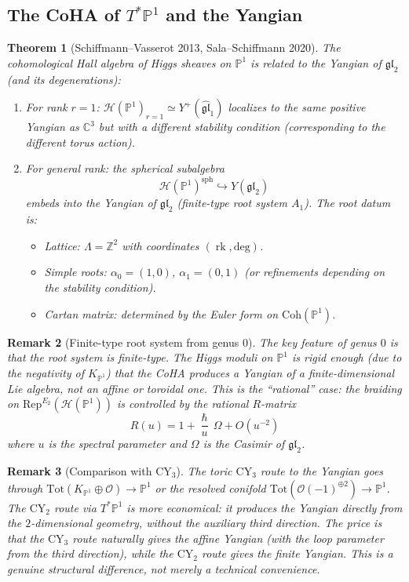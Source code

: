 \documentclass[11pt]{article}
\theoremstyle{garamondthm}
\newtheorem{theorem}{Theorem}[section]
\theoremstyle{garamonddef}
\theoremstyle{garamondrem}
\newtheorem{remark}[theorem]{Remark}
\newcommand{\Rep}{\mathrm{Rep}}
\newcommand{\Coh}{\mathrm{Coh}}
\newcommand{\CY}{\mathrm{CY}}
\newcommand{\Etwo}{E_2}
\newcommand{\cH}{\mathcal{H}}
\newcommand{\cO}{\mathcal{O}}
\renewcommand{\hbar}{\hslash}
\newcommand{\Tot}{\mathrm{Tot}}
\renewcommand{\deg}{\mathrm{deg}}
\DeclareMathOperator{\rk}{rk}
\begin{document}
\subsection{The CoHA of $T^*\mathbb{P}^1$ and the Yangian}
\label{ssec:coha-p1-yangian}

\begin{theorem}[Schiffmann--Vasserot 2013, Sala--Schiffmann 2020]
\label{thm:coha-p1-yangian}
The cohomological Hall algebra of Higgs sheaves on $\mathbb{P}^1$ is related to the Yangian of $\mathfrak{gl}_2$ (and its degenerations):
\begin{enumerate}[label=(\roman*)]
 \item For rank $r = 1$: $\cH(\mathbb{P}^1)_{r=1} \simeq Y^+(\widehat{\mathfrak{gl}}_1)$ localizes to the same positive Yangian as $\mathbb{C}^3$ but with a different stability condition (corresponding to the different torus action).
 \item For general rank: the spherical subalgebra
 \[
 \cH(\mathbb{P}^1)^{\mathrm{sph}} \hookrightarrow Y(\mathfrak{gl}_2)
 \]
 embeds into the Yangian of $\mathfrak{gl}_2$ (finite-type root system $A_1$). The root datum is:
 \begin{itemize}
 \item Lattice: $\Lambda = \mathbb{Z}^2$ with coordinates $(\rk, \deg)$.
 \item Simple roots: $\alpha_0 = (1, 0)$, $\alpha_1 = (0, 1)$ (or refinements depending on the stability condition).
 \item Cartan matrix: determined by the Euler form on $\Coh(\mathbb{P}^1)$.
 \end{itemize}
\end{enumerate}
\end{theorem}

\begin{remark}[Finite-type root system from genus $0$]
\label{rem:finite-type-genus0}
The key feature of genus $0$ is that the root system is \emph{finite-type}. The Higgs moduli on $\mathbb{P}^1$ is rigid enough (due to the negativity of $K_{\mathbb{P}^1}$) that the CoHA produces a Yangian of a finite-dimensional Lie algebra, not an affine or toroidal one. This is the ``rational'' case: the braiding on $\Rep^{\Etwo}(\cH(\mathbb{P}^1))$ is controlled by the \emph{rational $R$-matrix}
\[
 R(u) = 1 + \frac{\hbar}{u} \, \Omega + O(u^{-2})
\]
where $u$ is the spectral parameter and $\Omega$ is the Casimir of $\mathfrak{gl}_2$.
\end{remark}

\begin{remark}[Comparison with $\CY_3$]
\label{rem:cy3-comparison-p1}
The toric $\CY_3$ route to the Yangian goes through $\Tot(K_{\mathbb{P}^1} \oplus \cO) \to \mathbb{P}^1$ or the resolved conifold $\Tot(\cO(-1)^{\oplus 2}) \to \mathbb{P}^1$. The $\CY_2$ route via $T^*\mathbb{P}^1$ is more economical: it produces the Yangian directly from the $2$-dimensional geometry, without the auxiliary third direction. The price is that the $\CY_3$ route naturally gives the \emph{affine} Yangian (with the loop parameter from the third direction), while the $\CY_2$ route gives the \emph{finite} Yangian. This is a genuine structural difference, not merely a technical convenience.
\end{remark}
\end{document}
